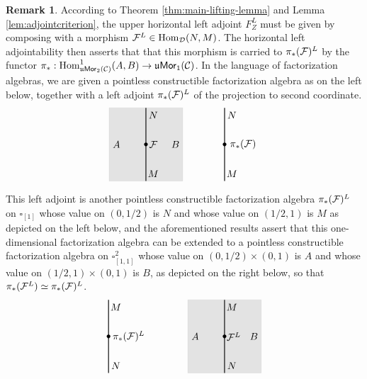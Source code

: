 \documentclass[10pt, reqno, twoside
, final
]{amsart}
\numberwithin{equation}{subsection}%
\theoremstyle{definition}
\theoremstyle{definition}
\theoremstyle{definition}
\theoremstyle{definition}
\theoremstyle{definition}
\theoremstyle{definition}
\theoremstyle{definition}
\theoremstyle{definition}
\theoremstyle{definition}
\theoremstyle{plain}
\theoremstyle{definition}
\theoremstyle{plain}
\theoremstyle{definition}
\theoremstyle{plain}
\theoremstyle{definition}
\newtheorem{rmk}[defn]{Remark}
\theoremstyle{definition}
\theoremstyle{plain}
\theoremstyle{plain}
\theoremstyle{definition}
\theoremstyle{plain}
\theoremstyle{plain}
\theoremstyle{plain}
\begin{document}
\begin{rmk}\label{rmk:extendfactorizationalg}
According to Theorem \ref{thm:main-lifting-lemma} and Lemma \ref{lem:adjointcriterion}, the upper horizontal left adjoint $F^L_Z$ must be given by composing with a morphism $\mathcal{F}^L\in \mathrm{Hom}_{\mathcal{D}}(N,M)$. The horizontal left adjointability then asserts that that this morphism is carried to $\pi_*(\mathcal{F})^L$ by the functor $\pi_*:\mathrm{Hom}_{\mathfrak{u}\mathsf{Mor}_2(\mathcal{C})}^1(A,B)\rightarrow \mathfrak{u}\mathsf{Mor}_1(\mathcal{C})$. In the language of factorization algebras, we are given a pointless constructible factorization algebra as on the left below, together with a left adjoint $\pi_*(\mathcal{F})^L{}$ of the projection to second coordinate. 
\begin{equation*}
\begin{tikzpicture}[scale=1.3]
\filldraw[opacity=0.1] (1,0) -- (0,0) -- (0,2)--(1,2);
\filldraw[opacity=0.1] (1,0) -- (2,0) -- (2,2)--(1,2);
\draw[thick] (1,0) -- (1,2);
\fill (1,1) circle (0.05);
\node at (1.2,0.2) {$M$};
\node at (1.2,1.8) {$N$};
\node at (1.2,1) {$\F$};
\node at (0.2,1) {$A$};
\node at (1.8,1) {$B$};
\end{tikzpicture} \qquad \qquad\begin{tikzpicture}[scale=1.3]
\draw[thick] (1,0) -- (1,2);
\fill (1,1) circle (0.05);
\node at (1.2,0.2) { $M$};
\node at (1.2,1.8) {$N$};
\node at (1.5,1) {$\pi_*(\F)$};
\end{tikzpicture} 
\end{equation*}
This left adjoint is another pointless constructible factorization algebra $\pi_*(\mathcal{F})^L$ on $\square_{[1]}$ whose value on $(0,1/2)$ is $N$ and whose value on $(1/2,1)$ is $M$ as depicted on the left below, and the aforementioned results assert that this one-dimensional factorization algebra can be extended to a pointless constructible factorization algebra on $\square^2_{[1,1]}$ whose value on $(0,1/2)\times (0,1)$ is $A$ and whose value on $(1/2,1)\times (0,1)$ is $B$, as depicted on the right below, so that $\pi_*(\mathcal{F}^{L})\simeq \pi_*(\mathcal{F})^L$.
\begin{equation*}
\begin{tikzpicture}[scale=1.3]
\draw[thick] (1,0) -- (1,2);
\fill (1,1) circle (0.05);
\node at (1.2,0.2) {$N$};
\node at (1.2,1.8) {$M$};
\node at (1.55,1) {$\pi_*(\F)^L$};
\end{tikzpicture} 
\qquad  \qquad \begin{tikzpicture}[scale=1.3]
\filldraw[opacity=0.1] (1,0) -- (0,0) -- (0,2)--(1,2);
\filldraw[opacity=0.1] (1,0) -- (2,0) -- (2,2)--(1,2);
\draw[thick] (1,0) -- (1,2);
\fill (1,1) circle (0.05);
\node at (1.2,0.2) {$N$};
\node at (1.2,1.8) {$M$};
\node at (1.25,1) {$\F^L$};
\node at (0.2,1) {$A$};
\node at (1.8,1) {$B$};
\end{tikzpicture}
\end{equation*} 
\end{rmk}
\end{document}
